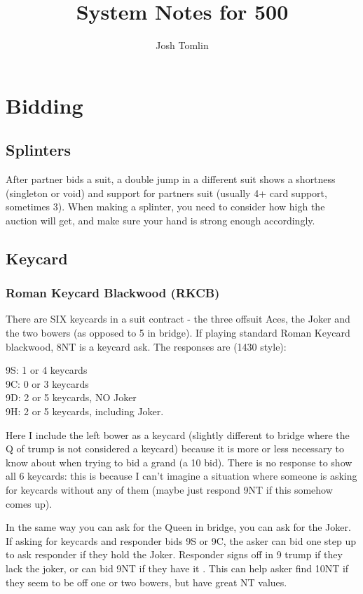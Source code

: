 \documentclass[a4paper]{report}
\title{System Notes for 500}
\author{Josh Tomlin}
\date{}
\theoremstyle{question}
\theoremstyle{theorem}
\theoremstyle{definition}
\newcommand{\<}{\left\langle}%
\renewcommand{\>}{\right\rangle}%
\begin{document}
\maketitle

\chapter*{Bidding}

\section*{Splinters}

After partner bids a suit, a double jump in a different suit shows a shortness (singleton or void) and support for partners suit (usually 4+ card support, sometimes 3). When making a splinter, you need to consider how high the auction will get, and make sure your hand is strong enough accordingly.


\section*{Keycard}

\subsection*{Roman Keycard Blackwood (RKCB)}

There are SIX keycards in a suit contract - the three offsuit Aces, the Joker and the two bowers (as opposed to 5 in bridge). If playing standard Roman Keycard blackwood, 8NT is a keycard ask. The responses are (1430 style):

9S: 1 or 4 keycards\\
9C: 0 or 3 keycards\\
9D: 2 or 5 keycards, NO Joker\\ 
9H: 2 or 5 keycards, including Joker.

Here I include the left bower as a keycard (slightly different to bridge where the Q of trump is not considered a keycard) because it is more or less necessary to know about when trying to bid a grand (a 10 bid). There is no response to show all 6 keycards: this is because I can't imagine a situation where someone is asking for keycards without any of them (maybe just respond 9NT if this somehow comes up).

In the same way you can ask for the Queen in bridge, you can ask for the Joker. If asking for keycards and responder bids 9S or 9C, the asker can bid one step up to ask responder if they hold the Joker. Responder signs off in 9 trump if they lack the joker, or can bid 9NT if they have it . This can help asker find 10NT if they seem to be off one or two bowers, but have great NT values. 
\end{document}
